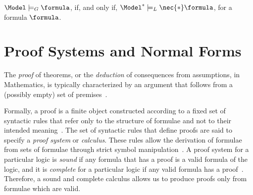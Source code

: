 \begin{theorem}
$\Model
\models_G \formula$, if, and only if, $\Model^* \models_L \nec{*} \formula$, for
a formula $\formula$. 
\end{theorem}

\section{Proof Systems and Normal Forms}

The \emph{proof} of theorems, or the \emph{deduction} of consequences from
assumptions, in Mathematics, is typically characterized by an argument that
follows from a (possibly empty) set of premises~\cite{kleene2002mathematical}.

Formally, a proof is a finite object constructed according to a fixed set of
syntactic rules that refer only to the structure of formulae and not to their
intended meaning~\cite{fitting}. The set of syntactic rules that define proofs
are said to specify a \emph{proof system} or \emph{calculus}. These rules allow
the derivation of formulae from sets of formulae through strict symbol
manipulation~\cite{resolutionbased}. A proof system for a
particular logic is \emph{sound} if any formula that has a proof is a valid formula of the
logic, and it is \emph{complete} for a particular logic if any valid formula has
a proof~\cite{fitting}. Therefore, a sound and complete calculus allows us to
produce proofs only from formulae which are valid. 


